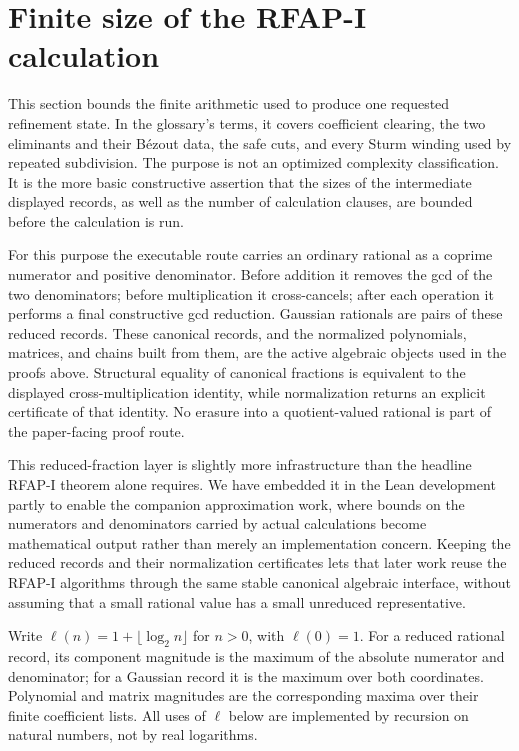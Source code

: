 \documentclass[11pt]{article}
\begin{document}
\section{Finite size of the RFAP-I calculation}
\label{sec:rfap-one-calculation-size}

This section bounds the finite arithmetic used to produce one requested
refinement state.  In the glossary's terms, it covers coefficient clearing,
the two eliminants and their B\'ezout data, the safe cuts, and every Sturm
winding used by repeated subdivision.  The purpose is not an optimized
complexity classification.  It is the more basic constructive assertion that
the sizes of the intermediate displayed records, as well as the number of
calculation clauses, are bounded before the calculation is run.

For this purpose the executable route carries an ordinary rational as a
coprime numerator and positive denominator.  Before addition it removes the
gcd of the two denominators; before multiplication it cross-cancels; after
each operation it performs a final constructive gcd reduction.  Gaussian
rationals are pairs of these reduced records.  These canonical records, and
the normalized polynomials, matrices, and chains built from them, are the
active algebraic objects used in the proofs above.  Structural equality of
canonical fractions is equivalent to the displayed cross-multiplication
identity, while normalization returns an explicit certificate of that
identity.  No erasure into a quotient-valued rational is part of the
paper-facing proof route.

This reduced-fraction layer is slightly more infrastructure than the
headline RFAP-I theorem alone requires.  We have embedded it in the Lean
development partly to enable the companion approximation work, where bounds
on the numerators and denominators carried by actual calculations become
mathematical output rather than merely an implementation concern.  Keeping
the reduced records and their normalization certificates lets that later
work reuse the RFAP-I algorithms through the same stable canonical algebraic
interface, without assuming that a small rational value has a small
unreduced representative.

Write $\ell(n)=1+\lfloor\log_2 n\rfloor$ for $n>0$, with
$\ell(0)=1$.  For a reduced rational record, its component magnitude is the
maximum of the absolute numerator and denominator; for a Gaussian record it
is the maximum over both coordinates.  Polynomial and matrix magnitudes are
the corresponding maxima over their finite coefficient lists.  All uses of
$\ell$ below are implemented by recursion on natural numbers, not by real
logarithms.
\end{document}
